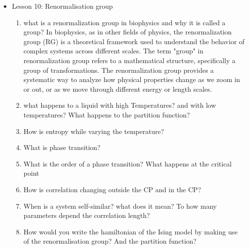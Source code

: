 {\begin{itemize}
\begin{enumerate}
        \item What does the Kirkwood Thermodynamical Integration theorem allows you to do?
        \item Obtain $P_0(v)$, which shape does it have?
        \item Supposing the Gaussian shape, what's the problem that you have with the curve that you generated?
        \item What does the calculation of the free energy difference allows you to do?
        \item How can you simplify the calculation? make the example regarding the solvated ion
        \item What is a reaction coordinate
        \item Make the example taking the distance as collective coordinate
    \end{enumerate}
    \item Lesson 10: Renormalisation group
    \begin{enumerate}
        \item what is a renormalization group in biophysics and why it is called a group? 
        In biophysics, as in other fields of physics, the renormalization group (RG) is a theoretical framework used to understand the behavior of 
        complex systems across different scales. The term "group" in renormalization group refers to a mathematical structure, specifically a group of 
        transformations. The renormalization group provides a systematic way to analyze how physical properties change as we zoom in or out, or as we
         move through different energy or length scales.
        \item what happens to a liquid with high Temperatures? and with low temperatures? What happens to the partition function?
        \item How is entropy while varying the temperature?
        \item What is phase transition?
        \item What is the order of a phase transition? What happens at the critical point
        \item How is correlation changing outside the CP and in the CP?
        \item When is a system self-similar? what does it mean? To how many parameters depend the correlation length? 
        \item How would you write the hamiltonian of the Ising model by making use of the renormalisation group? And the partition function?

\end{enumerate}
\end{itemize}}
